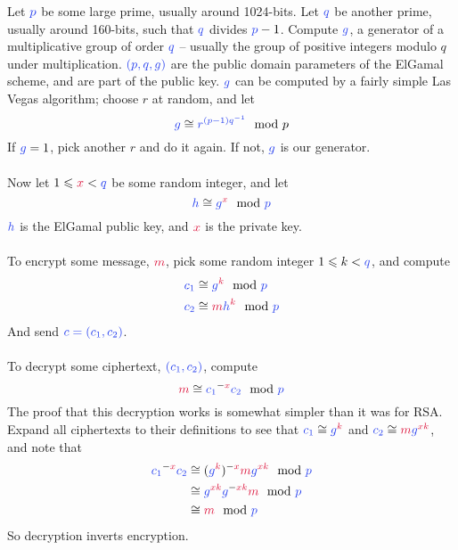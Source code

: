 	Let $\blue{p}$ be some large prime, usually around 1024-bits. Let $\blue{q}$ be another prime, usually around 160-bits, such that $\blue{q}$ divides $\blue{p}-1$. Compute $\blue{g}$, a generator of a multiplicative group of order $\blue{q}$ -- usually the group of positive integers modulo $q$ under multiplication. $\blue{(p,q,g)}$ are the public domain parameters of the ElGamal scheme, and are part of the public key. $\blue{g}$ can be computed by a fairly simple Las Vegas algorithm; choose $r$ at random, and let
	$$
		\blue{g} \cong \blue{r^{(p-1)q^{-1}}} \mod p
	$$
	If $\blue{g} = 1$, pick another $r$ and do it again. If not, $\blue{g}$ is our generator.\\
\\
	Now let $1 \leqslant \red{x} < \blue{q}$ be some random integer, and let
	$$
		\blue{h} \cong \blue{g}^\red{x} \mod \blue{p}
	$$
	$\blue{h}$ is the ElGamal public key, and $\red{x}$ is the private key.\\
\\
	To encrypt some message, $\red{m}$, pick some random integer $1 \leqslant k < \blue{q}$, and compute
	\begin{align*}
		\blue{c_1} &\cong \blue{g}^\red{k} \mod \blue{p}\\
		\blue{c_2} &\cong \red{m}\blue{h}^\red{k} \mod \blue{p}
	\end{align*}
	And send $\blue{c = (c_1,c_2)}$.\\
\\
	To decrypt some ciphertext, $\blue{(c_1,c_2)}$, compute
	$$
		\red{m} \cong \blue{c_1}^{-\red{x}}\blue{c_2} \mod \blue{p}
	$$
	The proof that this decryption works is somewhat simpler than it was for RSA. Expand all ciphertexts to their definitions to see that $\blue{c_1} \cong \blue{g}^\red{k}$ and $\blue{c_2} \cong \red{m}\blue{g}^{\red{xk}}$, and note that
	\begin{align*}
		 \blue{c_1}^{-\red{x}}\blue{c_2}
	&\cong (\blue{g}^\red{k})^{-\red{x}}\red{m}\blue{g}^\red{xk} \mod \blue{p} \\
	&\cong \blue{g}^{\red{xk}}\blue{g}^{-\red{xk}}\red{m} \mod \blue{p} \\
	&\cong \red{m} \mod \blue{p}
	\end{align*}
	So decryption inverts encryption.

